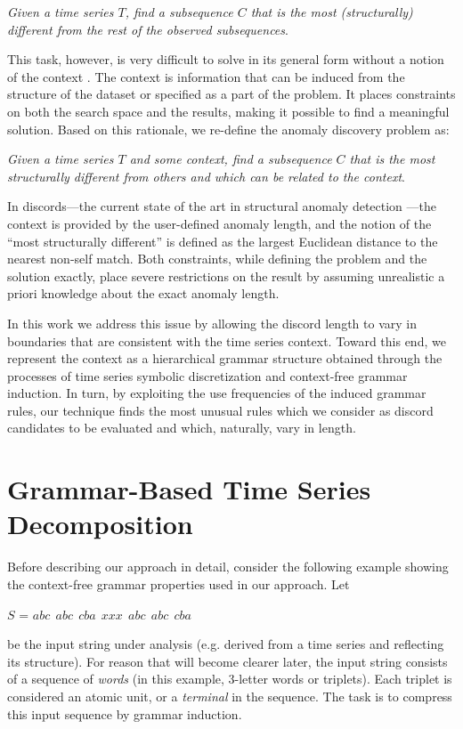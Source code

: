 \documentclass{sig-alternate}
\begin{document}
\textit{Given a time series $T$, find a subsequence $C$ that is the most (structurally) different from the rest of the observed subsequences}.

This task, however, is very difficult to solve in its general form without a notion of the context   \cite{chan_anomaly}.  The context is information that can be induced from the structure of the dataset or specified as a part of the problem. It places constraints on both the search space and the results, making it possible to find a meaningful solution. Based on this rationale, we re-define the anomaly discovery problem as: 

\textit{Given a time series $T$ and some context, find a subsequence $C$ that is the most structurally different from others and which can be related to the context}.

In discords---the current state of the art in structural anomaly detection \cite{chan_anomaly}---the context is provided by the user-defined anomaly length, and the notion of the ``most structurally different'' is defined as the largest Euclidean distance to the nearest non-self match. Both constraints, while defining the problem and the solution exactly, place severe restrictions on the result by assuming unrealistic a priori knowledge about the exact anomaly length. 

In this work we address this issue by allowing the discord length to vary in boundaries that are consistent with the time series context. Toward this end, we represent the context as a hierarchical grammar structure obtained through the processes of time series symbolic discretization and context-free grammar induction. In turn, by exploiting the use frequencies of the induced grammar rules, our technique finds the most unusual rules which we consider as discord candidates to be evaluated and which, naturally, vary in length.

\section{Grammar-Based Time Series Decomposition}\label{discretization}
Before describing our approach in detail, consider the following example showing the context-free grammar properties used in our approach. Let 
\begin{center}
\vspace{-1mm}
$S$ = $abc\ \ abc\ \ cba\ \ xxx\ \ abc\ \ abc\ \ cba$

\vspace{-1mm}
\end{center}
be the input string under analysis (e.g. derived from a time series and reflecting its structure). For reason that will become clearer later, the input string consists of a sequence of \textit{words} (in this example, 3-letter words or triplets). Each triplet is considered an atomic unit, or a \textit{terminal} in the sequence. The task is to compress this input sequence by grammar induction.
\end{document}

